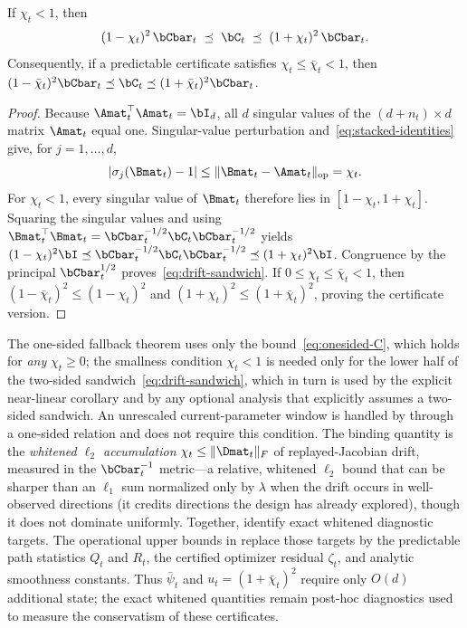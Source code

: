 \begin{corollary}\label{cor:drift-sandwich}
If $\chi_t<1$, then
\begin{equation}\label{eq:drift-sandwich}
  (1-\chi_t)^2\,\bCbar_t
  \;\preceq\;
  \bC_t
  \;\preceq\;
  (1+\chi_t)^2\,\bCbar_t .
\end{equation}
Consequently, if a predictable certificate satisfies
$\chi_t\le\bar\chi_t<1$, then
$(1-\bar\chi_t)^2\bCbar_t\preceq\bC_t
\preceq(1+\bar\chi_t)^2\bCbar_t$.
\end{corollary}
\begin{proof}
Because $\Amat_t^\top\Amat_t=\bI_d$, all $d$ singular values of the
$(d+n_t)\times d$ matrix $\Amat_t$ equal one.  Singular-value perturbation
and~\eqref{eq:stacked-identities} give, for $j=1,\ldots,d$,
\[
 |\sigma_j(\Bmat_t)-1|
 \le\|\Bmat_t-\Amat_t\|_{\rm op}=\chi_t.
\]
For $\chi_t<1$, every singular value of $\Bmat_t$ therefore lies in
$[1-\chi_t,1+\chi_t]$.  Squaring the singular values and using
$\Bmat_t^\top\Bmat_t=\bCbar_t^{-1/2}\bC_t\bCbar_t^{-1/2}$ yields
$(1-\chi_t)^2\bI\preceq
\bCbar_t^{-1/2}\bC_t\bCbar_t^{-1/2}
\preceq(1+\chi_t)^2\bI$.  Congruence by the principal
$\bCbar_t^{1/2}$ proves~\eqref{eq:drift-sandwich}.
If $0\le\chi_t\le\bar\chi_t<1$, then
$(1-\bar\chi_t)^2\le(1-\chi_t)^2$ and
$(1+\chi_t)^2\le(1+\bar\chi_t)^2$, proving the certificate version.
\end{proof}

The one-sided fallback theorem uses only the bound~\eqref{eq:onesided-C}, which
holds for \emph{any} $\chi_t\ge0$; the smallness condition
$\chi_t<1$ is needed only for the lower half of the two-sided
sandwich~\eqref{eq:drift-sandwich}, which in turn is used by the explicit
near-linear corollary and by any optional analysis that
explicitly assumes a two-sided sandwich.  An unrescaled current-parameter window is
handled by  through a one-sided relation and does not require this
condition.
The binding quantity is the \emph{whitened $\ell_2$ accumulation}
$\chi_t\le\|\Dmat_t\|_F$ of replayed-Jacobian drift, measured in the
$\bCbar_t^{-1}$ metric---a relative, whitened $\ell_2$ bound that can be sharper
than an $\ell_1$ sum normalized only by $\lambda$ when the drift occurs in
well-observed directions (it credits directions the design has already
explored), though it does not dominate uniformly.  Together,
 identify exact whitened diagnostic
targets.  The operational upper bounds in  replace
those targets by the predictable path statistics $Q_t$ and $R_t$, the certified
optimizer residual $\zeta_t$, and analytic smoothness constants.  Thus
$\bar\psi_t$ and $u_t=(1+\bar\chi_t)^2$ require only $O(d)$ additional state;
the exact whitened quantities remain post-hoc diagnostics used to measure the
conservatism of these certificates.

